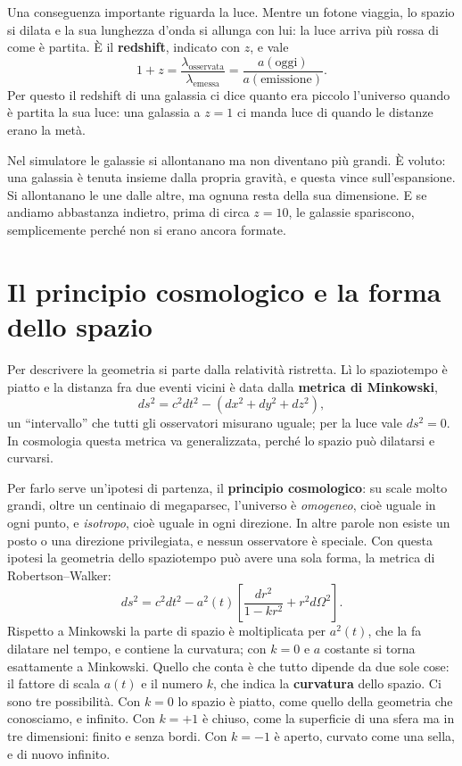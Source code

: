 \documentclass[12pt,a4paper]{article}
\begin{document}
Una conseguenza importante riguarda la luce. Mentre un fotone viaggia, lo spazio si dilata e la sua lunghezza d'onda si allunga con lui: la luce arriva più rossa di come è partita. È il \textbf{redshift}, indicato con $z$, e vale
\[ 1 + z = \frac{\lambda_{\text{osservata}}}{\lambda_{\text{emessa}}} = \frac{a(\text{oggi})}{a(\text{emissione})} . \]
Per questo il redshift di una galassia ci dice quanto era piccolo l'universo quando è partita la sua luce: una galassia a $z = 1$ ci manda luce di quando le distanze erano la metà.

Nel simulatore le galassie si allontanano ma non diventano più grandi. È voluto: una galassia è tenuta insieme dalla propria gravità, e questa vince sull'espansione. Si allontanano le une dalle altre, ma ognuna resta della sua dimensione. E se andiamo abbastanza indietro, prima di circa $z = 10$, le galassie spariscono, semplicemente perché non si erano ancora formate.

\section{Il principio cosmologico e la forma dello spazio}
Per descrivere la geometria si parte dalla relatività ristretta. Lì lo spaziotempo è piatto e la distanza fra due eventi vicini è data dalla \textbf{metrica di Minkowski},
\[ ds^2 = c^2 dt^2 - \left(dx^2 + dy^2 + dz^2\right), \]
un ``intervallo'' che tutti gli osservatori misurano uguale; per la luce vale $ds^2 = 0$. In cosmologia questa metrica va generalizzata, perché lo spazio può dilatarsi e curvarsi.

Per farlo serve un'ipotesi di partenza, il \textbf{principio cosmologico}: su scale molto grandi, oltre un centinaio di megaparsec, l'universo è \emph{omogeneo}, cioè uguale in ogni punto, e \emph{isotropo}, cioè uguale in ogni direzione. In altre parole non esiste un posto o una direzione privilegiata, e nessun osservatore è speciale. Con questa ipotesi la geometria dello spaziotempo può avere una sola forma, la metrica di Robertson--Walker:
\[ ds^2 = c^2 dt^2 - a^2(t)\left[\frac{dr^2}{1-kr^2} + r^2 d\Omega^2\right]. \]
Rispetto a Minkowski la parte di spazio è moltiplicata per $a^2(t)$, che la fa dilatare nel tempo, e contiene la curvatura; con $k = 0$ e $a$ costante si torna esattamente a Minkowski. Quello che conta è che tutto dipende da due sole cose: il fattore di scala $a(t)$ e il numero $k$, che indica la \textbf{curvatura} dello spazio. Ci sono tre possibilità. Con $k = 0$ lo spazio è piatto, come quello della geometria che conosciamo, e infinito. Con $k = +1$ è chiuso, come la superficie di una sfera ma in tre dimensioni: finito e senza bordi. Con $k = -1$ è aperto, curvato come una sella, e di nuovo infinito.
\end{document}
